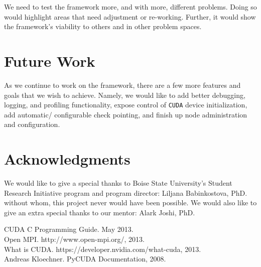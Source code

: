 \documentclass{acm_proc_article-sp}
\begin{document}
We need to test the framework more, and with more, different problems. Doing so
would highlight areas that need adjustment or re-working. Further, it would
show the framework's viability to others and in other problem spaces.

\section{Future Work}

As we continue to work on the framework, there are a few more features and
goals that we wish to achieve. Namely, we would like to add better debugging,
logging, and profiling functionality, expose control of \texttt{CUDA} device
initialization, add automatic/ configurable check pointing, and finish up node
administration and configuration.

\section{Acknowledgments}

We would like to give a special thanks to Boise State University's Student
Research Initiative program and program director: Liljana Babinkostova, PhD.
without whom, this project never would have been possible. We would also like
to give an extra special thanks to our mentor: Alark Joshi, PhD.


\begin{thebibliography}{4}
CUDA C Programming Guide. May 2013.\\{}
{Open MPI}. http://www.open-mpi.org/, 2013.\\{}
What is {CUDA}.
https://developer.nvidia.com/what-cuda, 2013.\\{}
Andreas Kloechner. PyCUDA Documentation, 2008.\\{}
\end{thebibliography}

\balancecolumns{}
\end{document}
